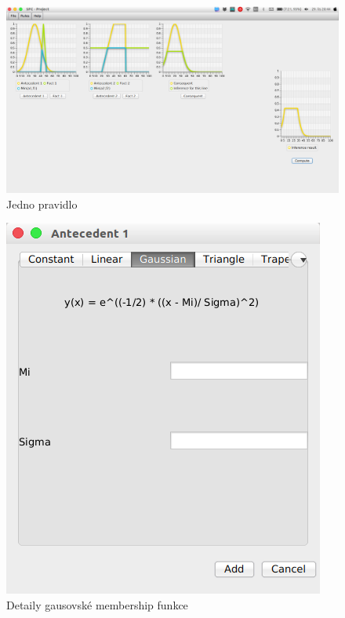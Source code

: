 \documentclass[12pt,a4paper,titlepage]{article}
\begin{document}
\begin{figure}[!htbp]
	\centering
	\includegraphics[scale=0.3]{oneRule}
	\caption{Jedno pravidlo}
	\label{oneRule}
\end{figure}

\begin{figure}[!htbp]
	\centering
	\includegraphics[scale=0.5]{setDetailsGaussian}
	\caption{Detaily gausovské membership funkce}
	\label{setDetailsGaussian}
\end{figure}
\end{document}
